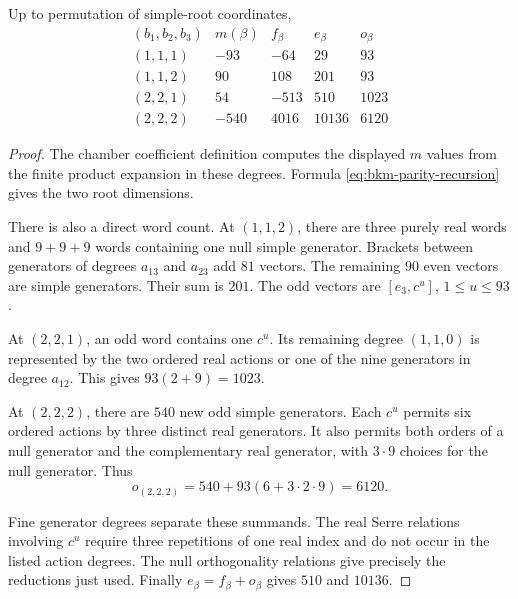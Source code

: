 \begin{proposition}
\label{prop:bkm-height-six-parities}
Up to permutation of simple-root coordinates,
\[
\begin{array}{c|r|r|r|r}
 (b_1,b_2,b_3)&m(\beta)&f_\beta&e_\beta&o_\beta\\\hline
 (1,1,1)&-93&-64&29&93\\
 (1,1,2)&90&108&201&93\\
 (2,2,1)&54&-513&510&1023\\
 (2,2,2)&-540&4016&10136&6120
\end{array}
\]
\end{proposition}
\begin{proof}
The chamber coefficient definition computes the displayed $m$ values
from the finite product expansion in these degrees. Formula
\eqref{eq:bkm-parity-recursion} gives the two root dimensions.

There is also a direct word count. At $(1,1,2)$, there are three purely real words and $9+9+9$ words
containing one null simple generator. Brackets between generators of
degrees $a_{13}$ and $a_{23}$ add $81$ vectors. The remaining $90$
even vectors are simple generators. Their sum is $201$.
The odd vectors are $[e_3,c^u]$, $1\leq u\leq93$.

At $(2,2,1)$, an odd word contains one $c^u$. Its remaining degree
$(1,1,0)$ is represented by the two ordered real actions or one of
the nine generators in degree $a_{12}$. This gives
$93(2+9)=1023$.

At $(2,2,2)$, there are $540$ new odd simple generators. Each
$c^u$ permits six ordered actions by three distinct real generators.
It also permits both orders of a null generator and the complementary
real generator, with $3\cdot9$ choices for the null generator. Thus
\[
 o_{(2,2,2)}=540+93(6+3\cdot2\cdot9)=6120.
\]

Fine generator degrees separate these summands. The real Serre
relations involving $c^u$ require three repetitions of one real
index and do not occur in the listed action degrees. The null
orthogonality relations give precisely the reductions just used.
Finally $e_\beta=f_\beta+o_\beta$ gives $510$ and $10136$.
\end{proof}

